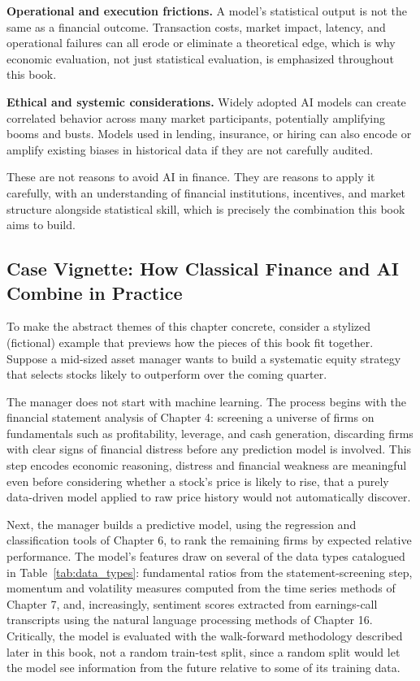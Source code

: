 \documentclass[../ai_in_finance]{subfiles}
\begin{document}
\textbf{Operational and execution frictions.} A model's statistical output is not the same as a financial outcome. Transaction costs, market impact, latency, and operational failures can all erode or eliminate a theoretical edge, which is why economic evaluation, not just statistical evaluation, is emphasized throughout this book.

\textbf{Ethical and systemic considerations.} Widely adopted AI models can create correlated behavior across many market participants, potentially amplifying booms and busts. Models used in lending, insurance, or hiring can also encode or amplify existing biases in historical data if they are not carefully audited.

These are not reasons to avoid AI in finance. They are reasons to apply it carefully, with an understanding of financial institutions, incentives, and market structure alongside statistical skill, which is precisely the combination this book aims to build.

\subsection{Case Vignette: How Classical Finance and AI Combine in Practice}

To make the abstract themes of this chapter concrete, consider a stylized (fictional) example that previews how the pieces of this book fit together. Suppose a mid-sized asset manager wants to build a systematic equity strategy that selects stocks likely to outperform over the coming quarter.

The manager does not start with machine learning. The process begins with the financial statement analysis of Chapter 4: screening a universe of firms on fundamentals such as profitability, leverage, and cash generation, discarding firms with clear signs of financial distress before any prediction model is involved. This step encodes economic reasoning, distress and financial weakness are meaningful even before considering whether a stock's price is likely to rise, that a purely data-driven model applied to raw price history would not automatically discover.

Next, the manager builds a predictive model, using the regression and classification tools of Chapter 6, to rank the remaining firms by expected relative performance. The model's features draw on several of the data types catalogued in Table~\ref{tab:data_types}: fundamental ratios from the statement-screening step, momentum and volatility measures computed from the time series methods of Chapter 7, and, increasingly, sentiment scores extracted from earnings-call transcripts using the natural language processing methods of Chapter 16. Critically, the model is evaluated with the walk-forward methodology described later in this book, not a random train-test split, since a random split would let the model see information from the future relative to some of its training data.
\end{document}
